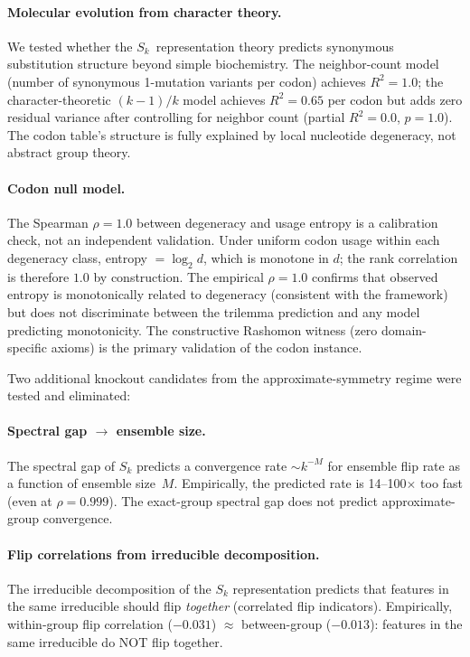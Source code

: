 \documentclass[11pt,a4paper]{article}
\begin{document}
\paragraph{Molecular evolution from character theory.}
We tested whether the $S_k$~representation theory predicts synonymous
substitution structure beyond simple biochemistry.  The neighbor-count model
(number of synonymous 1-mutation variants per codon) achieves $R^2 = 1.0$; the
character-theoretic $(k{-}1)/k$ model achieves $R^2 = 0.65$ per codon but adds
zero residual variance after controlling for neighbor count (partial $R^2 = 0.0$,
$p = 1.0$).  The codon table's structure is fully explained by local
nucleotide degeneracy, not abstract group theory.

\paragraph{Codon null model.}
The Spearman $\rho = 1.0$ between degeneracy and usage entropy is a calibration check, not an independent validation. Under uniform codon usage within each degeneracy class, entropy $= \log_2 d$, which is monotone in $d$; the rank correlation is therefore $1.0$ by construction. The empirical $\rho = 1.0$ confirms that observed entropy is monotonically related to degeneracy (consistent with the framework) but does not discriminate between the trilemma prediction and any model predicting monotonicity. The constructive Rashomon witness (zero domain-specific axioms) is the primary validation of the codon instance.

Two additional knockout candidates from the approximate-symmetry regime were
tested and eliminated:

\paragraph{Spectral gap $\to$ ensemble size.}
The spectral gap of $S_k$ predicts a convergence rate $\sim k^{-M}$ for
ensemble flip rate as a function of ensemble size~$M$.  Empirically, the
predicted rate is 14--100$\times$ too fast (even at $\rho = 0.999$).  The
exact-group spectral gap does not predict approximate-group convergence.

\paragraph{Flip correlations from irreducible decomposition.}
The irreducible decomposition of the $S_k$ representation predicts that
features in the same irreducible should flip \emph{together} (correlated
flip indicators).  Empirically, within-group flip correlation ($-0.031$)
$\approx$ between-group ($-0.013$): features in the same irreducible do NOT
flip together.
\end{document}
